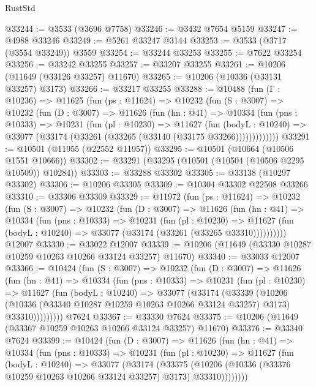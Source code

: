 \begin{lexlean}{RustStd}
\begin{coremodule}
@33244 := @3533 (@3696 @7758)
@33246 := @3432 @7654 @5159
@33247 := @4988 @33246
@33249 := @5261 @33247 @3144
@33253 := @3533 (@3717 (@3554 @33249)) @3559
@33254 := @33244 @33253
@33255 := @7622 @33254
@33256 := @33242 @33255
@33257 := @33207 @33255
@33261 := @10206 (@11649 (@33126 @33257) @11670)
@33265 := @10206 (@10336 (@33131 @33257) @3173)
@33266 := @33217 @33255
@33288 := @10488
    (fun (Γ : @10236) =>
    @11625
      (fun (ps : @11624) =>
      @10232
        (fun (S : @3007) =>
        @10232
          (fun (D : @3007) =>
          @11626
            (fun (hn : @41) =>
            @10334
              (fun (pns : @10333) =>
              @10231
                (fun (pl : @10230) =>
                @11627
                  (fun (bodyL : @10240) =>
                  @33077 (@33174 (@33261 (@33265 (@33140 (@33175 @33266)))))))))))))
@33291 := @10501 (@11955 (@22552 @11957))
@33295 := @10501 (@10664 (@10506 @1551 @10666))
@33302 := @33291 (@33295 (@10501 (@10504 (@10506 @2295 @10509)) @10284))
@33303 := @33288 @33302
@33305 := @33138 (@10297 @33302)
@33306 := @10206 @33305
@33309 := @10304 @33302 @22508 @33266
@33310 := @33306 @33309
@33329 := @11972
    (fun (ps : @11624) =>
    @10232
      (fun (S : @3007) =>
      @10232
        (fun (D : @3007) =>
        @11626
          (fun (hn : @41) =>
          @10334
            (fun (pns : @10333) =>
            @10231
              (fun (pl : @10230) =>
              @11627 (fun (bodyL : @10240) => @33077 (@33174 (@33261 (@33265 @33310))))))))))
    @12007
@33330 := @33022 @12007
@33339 := @10206 (@11649 (@33330 @10287 @10259 @10263 @10266 @33124 @33257) @11670)
@33340 := @33033 @12007
@33366 := @10424
    (fun (S : @3007) =>
    @10232
      (fun (D : @3007) =>
      @11626
        (fun (hn : @41) =>
        @10334
          (fun (pns : @10333) =>
          @10231
            (fun (pl : @10230) =>
            @11627
              (fun (bodyL : @10240) =>
              @33077
                (@33174
                  (@33339
                    (@10206
                      (@10336 (@33340 @10287 @10259 @10263 @10266 @33124 @33257) @3173)
                      @33310)))))))))
    @7624
@33367 := @33330 @7624
@33375 := @10206 (@11649 (@33367 @10259 @10263 @10266 @33124 @33257) @11670)
@33376 := @33340 @7624
@33399 := @10424
    (fun (D : @3007) =>
    @11626
      (fun (hn : @41) =>
      @10334
        (fun (pns : @10333) =>
        @10231
          (fun (pl : @10230) =>
          @11627
            (fun (bodyL : @10240) =>
            @33077
              (@33174
                (@33375
                  (@10206 (@10336 (@33376 @10259 @10263 @10266 @33124 @33257) @3173) @33310))))))))

\end{coremodule}
\end{lexlean}
